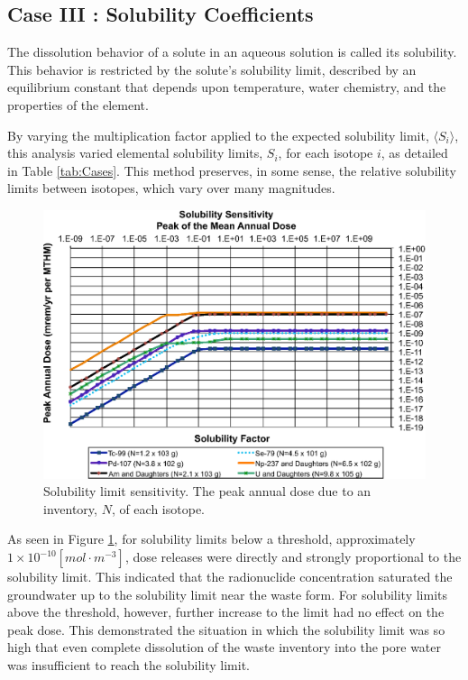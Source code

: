 
\subsection{Case III : Solubility Coefficients}

The dissolution behavior of a solute in an aqueous solution is called its 
solubility. This behavior is restricted by the solute's solubility limit, described  
by an equilibrium constant that depends upon temperature, water chemistry, and 
the properties of the element. 

By varying the multiplication factor applied to the expected solubility limit, 
$\langle S_i\rangle$, this analysis varied elemental solubility limits, $S_i$, 
for each isotope $i$, as detailed in Table \ref{tab:Cases}.
This method preserves, in some sense, the relative solubility 
limits between isotopes, which vary over many magnitudes.

\begin{figure}[H]
  \centering
  \includegraphics[width=\linewidth]{solubility.eps}
  \caption{Solubility limit sensitivity. The peak annual dose due to an 
  inventory, 
  $N$, of each isotope.}
  \label{fig:SolSum}
\end{figure}

As seen in Figure \ref{fig:SolSum}, for solubility limits below a threshold, 
approximately $1\times10^{-10}[mol\cdot m^{-3}]$, dose releases were directly 
and strongly proportional to the solubility limit. This indicated that the 
radionuclide concentration saturated the groundwater up to the solubility limit 
near the waste form.  For solubility limits above the threshold, however, 
further increase to the limit had no effect on the peak dose. This demonstrated 
the situation in which the solubility limit was so high that even complete 
dissolution of the waste inventory into the pore water was insufficient to reach 
the solubility limit.

